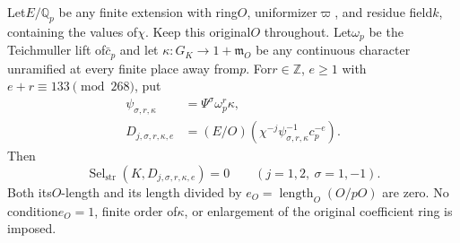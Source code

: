 \begin{theorem}
\label{thm:ACG134strict}
Let$E/\mathbb Q_p$ be any finite extension with ring$O$,
uniformizer$\varpi$, and residue field$k$, containing the values
of$\chi$.  Keep this original$O$ throughout.
Let$\omega_p$ be the Teichmuller lift of$\bar c_p$ and let
$\kappa:G_K\to1+\mathfrak m_O$ be any continuous character
unramified at every finite place away from$p$.
For$r\in\mathbb Z$, $e\ge1$ with$e+r\equiv133\pmod{268}$, put
\[
 \begin{split}
 \psi_{\sigma,r,\kappa}&=\Psi^\sigma\omega_p^r\kappa,\\
 D_{j,\sigma,r,\kappa,e}
       &=(E/O)(\chi^{-j}\psi_{\sigma,r,\kappa}^{-1}c_p^{-e}).
 \end{split}
 \tag{RQSV.24}
\]
Then
\[
      \operatorname{Sel}_{\mathrm{str}}
             (K,D_{j,\sigma,r,\kappa,e})=0
                  \qquad(j=1,2,\ \sigma=1,-1).
 \tag{RQSV.25}
\]
Both its$O$-length and its length divided by
$e_O=\operatorname{length}_O(O/pO)$ are zero.
No condition$e_O=1$, finite order of$\kappa$, or enlargement of
the original coefficient ring is imposed.
\end{theorem}

